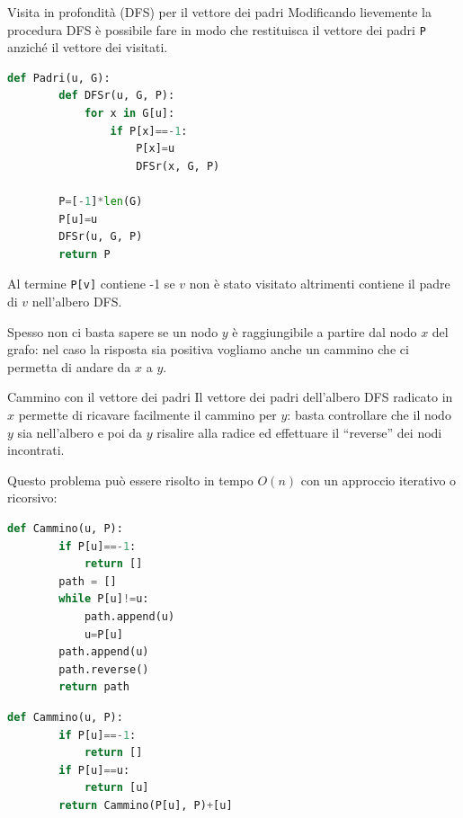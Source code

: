\begin{Algoritmo}{Visita in profondità (DFS) per il vettore dei padri}{}
    Modificando lievemente la procedura DFS è possibile fare in modo che restituisca il vettore dei padri \verb|P| anziché il vettore dei visitati.

    \begin{lstlisting}[language=Python]
    def Padri(u, G):
        def DFSr(u, G, P):
            for x in G[u]:
                if P[x]==-1:
                    P[x]=u
                    DFSr(x, G, P)
        
        P=[-1]*len(G)
        P[u]=u
        DFSr(u, G, P)
        return P
    \end{lstlisting}

    Al termine \verb|P[v]| contiene -1 se $v$ non è stato visitato altrimenti contiene il padre di $v$ nell'albero DFS.
\end{Algoritmo}

Spesso non ci basta sapere se un nodo $y$ è raggiungibile a partire dal nodo $x$ del grafo: nel caso la risposta sia positiva vogliamo anche un cammino che ci permetta di andare da $x$ a $y$.

\begin{Algoritmo}{Cammino con il vettore dei padri}{}
    Il vettore dei padri dell'albero DFS radicato in $x$ permette di ricavare facilmente il cammino per $y$: basta controllare che il nodo $y$ sia nell'albero e poi da $y$ risalire alla radice ed effettuare il “reverse” dei nodi incontrati.

    Questo problema può essere risolto in tempo $O(n)$ con un approccio iterativo o ricorsivo:

    \begin{minipage}[t]{0.50\textwidth}
    \begin{lstlisting}[language=Python]
    def Cammino(u, P):
        if P[u]==-1:
            return []
        path = []
        while P[u]!=u:
            path.append(u)
            u=P[u]
        path.append(u)
        path.reverse()
        return path
    \end{lstlisting}
    \end{minipage}
    \hspace{-1cm}
    \begin{minipage}[t]{0.50\textwidth}
    \begin{lstlisting}[language=Python]
    def Cammino(u, P):
        if P[u]==-1:
            return []
        if P[u]==u:
            return [u]
        return Cammino(P[u], P)+[u]
    \end{lstlisting}
    \end{minipage}
\end{Algoritmo}

